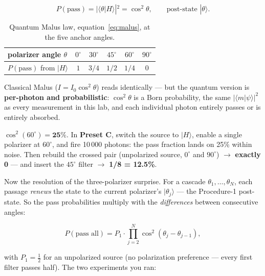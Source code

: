 \documentclass[a4paper,11pt]{article}
\providecommand{\ket}[1]{|#1\rangle}
\providecommand{\braket}[2]{\langle#1|#2\rangle}
\begin{document}
\begin{equation}
    P(\text{pass}) = |\braket{\theta}{H}|^2 = \cos^2\theta,
    \qquad \text{post-state } \ket{\theta}.
    \label{eq:malus}
\end{equation}

\begin{table}[H]
\centering
\begin{tabular}{lccccc}
\toprule
polarizer angle $\theta$ & $0^\circ$ & $30^\circ$ & $45^\circ$ & $60^\circ$ & $90^\circ$ \\
\midrule
$P(\text{pass})$ from $\ket{H}$ & $1$ & $3/4$ & $1/2$ & $1/4$ & $0$ \\
\bottomrule
\end{tabular}
\caption{Quantum Malus law, equation~\eqref{eq:malus}, at the five anchor angles.}
\label{tab:malus}
\end{table}

Classical Malus ($I = I_0\cos^2\theta$) reads identically --- but the quantum version
is \textbf{per-photon and probabilistic}: $\cos^2\theta$ is a Born probability, the
same $|\braket{m}{\psi}|^2$ as every measurement in this lab, and each individual
photon entirely passes or is entirely absorbed.

\begin{numberbox}
$\cos^2(60^\circ) = \mathbf{25\%}$. In \textbf{Preset C}, switch the source to
$\ket{H}$, enable a single polarizer at $60^\circ$, and fire 10\,000 photons: the
pass fraction lands on 25\% within noise. Then rebuild the crossed pair (unpolarized
source, $0^\circ$ and $90^\circ$) $\rightarrow$ \textbf{exactly 0} --- and insert the
$45^\circ$ filter $\rightarrow$ \textbf{1/8 = 12.5\%}.
\end{numberbox}

Now the resolution of the three-polarizer surprise. For a cascade
$\theta_1, \dots, \theta_N$, each passage \emph{renews} the state to the current
polarizer's $\ket{\theta_j}$ --- the Procedure-1 post-state. So the pass
probabilities multiply with the \emph{differences} between consecutive angles:

\begin{equation}
    P(\text{pass all}) = P_1 \cdot \prod_{j=2}^{N}\cos^2(\theta_j - \theta_{j-1}),
    \label{eq:cascade}
\end{equation}

\noindent with $P_1 = \tfrac12$ for an unpolarized source (no polarization
preference --- every first filter passes half). The two experiments you ran:
\end{document}
